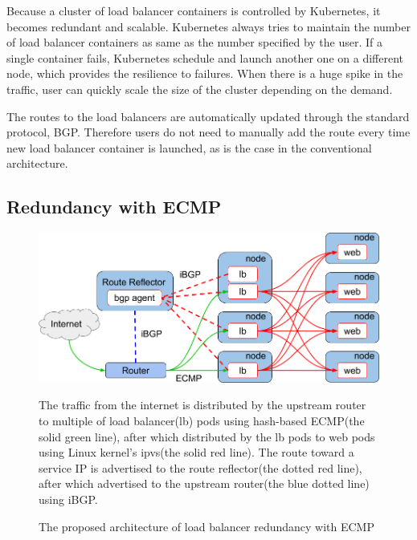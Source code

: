 Because a cluster of load balancer containers is controlled by Kubernetes, it becomes redundant and scalable.
Kubernetes always tries to maintain the number of load balancer containers as same as the number specified by the user.
If a single container fails, Kubernetes schedule and launch another one on a different node, which provides the resilience to failures.
When there is a huge spike in the traffic, user can quickly scale the size of the cluster depending on the demand.

The routes to the load balancers are automatically updated through the standard protocol, BGP.
Therefore users do not need to manually add the route every time new load balancer container is launched, as is the case in the conventional architecture.

\FloatBarrier

\subsection{Redundancy with ECMP}\label{Redundancy with ECMP}

\begin{figure}[tb]
  \centering
  \includegraphics[width=0.8\columnwidth]{Figs/ecmp.png}
\caption{The proposed architecture of load balancer redundancy with ECMP}

\vspace{1mm}

\begin{minipage}{0.9\columnwidth}
   The traffic from the internet is distributed by the upstream router to multiple of load balancer(lb) pods using hash-based ECMP(the solid green line), after which distributed by the lb pods to web pods using Linux kernel's ipvs(the solid red line).
  The route toward a service IP is advertised to the route reflector(the dotted red line), after which advertised to the upstream router(the blue dotted line) using iBGP.
\end{minipage}

\label{fig:ecmp}
\end{figure}

